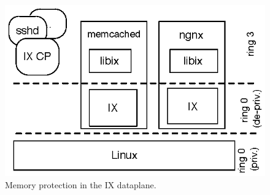 \begin{figure}
\begin{centering}
\includegraphics{figs/cp-dp.eps}
\caption{Memory protection in the IX dataplane.}
\label{fig:cp-dp}
\end{centering}
\end{figure}

